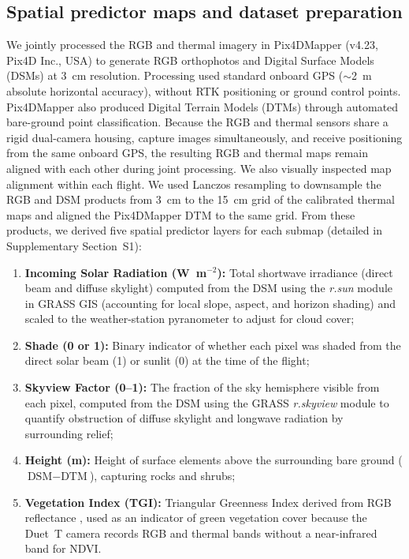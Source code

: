 \documentclass[12pt]{article}
\begin{document}
\subsection{Spatial predictor maps and dataset preparation}

\noindent We jointly processed the RGB and thermal imagery in Pix4DMapper (v4.23, Pix4D Inc., USA) to generate RGB orthophotos and Digital Surface Models (DSMs) at 3~cm resolution. Processing used standard onboard GPS ($\sim$2~m absolute horizontal accuracy), without RTK positioning or ground control points. Pix4DMapper also produced Digital Terrain Models (DTMs) through automated bare-ground point classification. Because the RGB and thermal sensors share a rigid dual-camera housing, capture images simultaneously, and receive positioning from the same onboard GPS, the resulting RGB and thermal maps remain aligned with each other during joint processing. We also visually inspected map alignment within each flight. We used Lanczos resampling to downsample the RGB and DSM products from 3~cm to the 15~cm grid of the calibrated thermal maps and aligned the Pix4DMapper DTM to the same grid. From these products, we derived five spatial predictor layers for each submap (detailed in Supplementary Section~S1):
\begin{enumerate}[leftmargin=*, nosep]
    \item \textbf{Incoming Solar Radiation (W~m$^{-2}$):} Total shortwave irradiance (direct beam and diffuse skylight) computed from the DSM using the \textit{r.sun} module in GRASS GIS \citep{GRASS_GIS_software, BIVAND20001043} (accounting for local slope, aspect, and horizon shading) and scaled to the weather-station pyranometer to adjust for cloud cover;
    \item \textbf{Shade (0 or 1):} Binary indicator of whether each pixel was shaded from the direct solar beam (1) or sunlit (0) at the time of the flight;
    \item \textbf{Skyview Factor (0--1):} The fraction of the sky hemisphere visible from each pixel, computed from the DSM using the GRASS \textit{r.skyview} module to quantify obstruction of diffuse skylight and longwave radiation by surrounding relief;
    \item \textbf{Height (m):} Height of surface elements above the surrounding bare ground ($\text{DSM} - \text{DTM}$), capturing rocks and shrubs;
    \item \textbf{Vegetation Index (TGI):} Triangular Greenness Index derived from RGB reflectance \citep{hunt_2013}, used as an indicator of green vegetation cover because the Duet~T camera records RGB and thermal bands without a near-infrared band for NDVI.
\end{enumerate}
\end{document}
